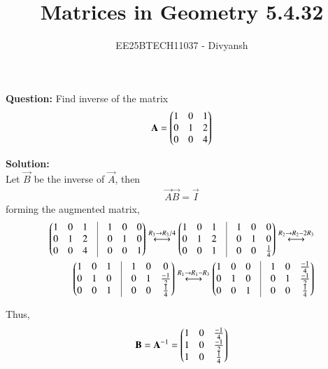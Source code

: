 \documentclass[journal,12pt,onecolumn]{IEEEtran}
\title{Matrices in Geometry 5.4.32}
\author{EE25BTECH11037 - Divyansh}
\theoremstyle{remark}
\begin{document}
\vspace{3cm}
\maketitle
{\let\newpage\relax\maketitle}
\textbf{Question: }
Find inverse of the matrix 
\begin{align*}
    \mathbf{A}=\begin{pmatrix}1 & 0 & 1 \\ 0 & 1 & 2 \\ 0 & 0 & 4\end{pmatrix}
\end{align*}

\vspace{2mm}

\textbf{Solution:}
\\
Let $\vec{B}$ be the inverse of $\vec{A}$, then
\begin{align}
    \vec{A}\vec{B}=\vec{I}
\end{align}
forming the augmented matrix,
\begin{align}
    \myvec{1 & 0 & 1 & \vrule &1 & 0 & 0\\ 0 & 1 & 2 & \vrule & 0 & 1 & 0\\ 0 & 0 & 4 &\vrule & 0 & 0&1}\overset{R_3 \rightarrow R_3 /4 }{\longleftrightarrow} 
    \myvec{1 & 0 & 1 & \vrule &1 & 0 & 0\\ 0 & 1 & 2 & \vrule & 0 & 1 & 0\\ 0 & 0 & 1 &\vrule & 0 & 0&\frac{1}{4}}\overset{R_2 \rightarrow R_2 - 2R_3 }{\longleftrightarrow}\\
    \myvec{1 & 0 & 1 & \vrule &1 & 0 & 0\\ 0 & 1 & 0 & \vrule & 0 & 1 & \frac{-1}{2}\\ 0 & 0 & 1 &\vrule & 0 & 0&\frac{1}{4}}
    \overset{R_1 \rightarrow R_1 - R_3 }{\longleftrightarrow}
    \myvec{1 & 0 & 0 & \vrule &1 & 0 & \frac{-1}{4}\\ 0 & 1 & 0 & \vrule & 0 & 1 & \frac{-1}{2}\\ 0 & 0 & 1 &\vrule & 0 & 0&\frac{1}{4}}
\end{align}

Thus, 
\begin{align}
    \mathbf{B}=\mathbf{A}^{-1} =\begin{pmatrix}1 & 0 & \frac{-1}{4} \\ 1 & 0 & \frac{-1}{2} \\1 & 0 & \frac{1}{4}\end{pmatrix}
\end{align}
\end{document}
